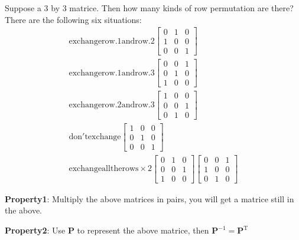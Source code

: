         Suppose a 3 by 3 matrice. Then how many kinds of row permutation are there?
        There are the following  six situations:
            \begin{equation}
                \begin{aligned}
                    \mathrm{exchange row.1 and row.2}
                    \begin{bmatrix}
                        0 & 1 & 0\\
                        1 & 0 & 0\\
                        0 & 0 & 1
                    \end{bmatrix} \\
                    \mathrm{exchange row.1 and row.3} 
                    \begin{bmatrix}
                        0 & 0 & 1\\
                        0 & 1 & 0\\
                        1 & 0 & 0
                    \end{bmatrix}\\
                    \mathrm{exchange row.2 and row.3} 
                    \begin{bmatrix}
                        1 & 0 & 0\\
                        0 & 0 & 1\\
                        0 & 1 & 0
                    \end{bmatrix}\\
                    \mathrm{don't exchange}
                    \begin{bmatrix}
                        1 & 0 & 0\\
                        0 & 1 & 0\\
                        0 & 0 & 1
                    \end{bmatrix} \\
                    \mathrm{exchange all the rows} \times 2 
                    \begin{bmatrix}
                        0 & 1 & 0\\
                        0 & 0 & 1\\
                        1 & 0 & 0
                    \end{bmatrix}
                    \begin{bmatrix}
                        0 & 0 & 1\\
                        1 & 0 & 0\\
                        0 & 1 & 0
                    \end{bmatrix}
                \end{aligned}
            \end{equation}
        
        \textbf{Property1}: Multiply the above matrices in pairs, you will get a matrice still in the above.

        \textbf{Property2}: Use \textbf{P} to represent the above matrice, then $\mathbf{P}^{-1} = \mathbf{P}^{\mathrm{T}}$




